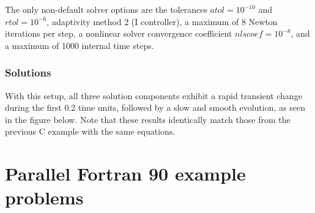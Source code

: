 \documentclass[letterpaper,10pt,english]{sphinxmanual}
\begin{document}
The only non-default solver options are the tolerances
\(atol=10^{-10}\) and \(rtol=10^{-6}\), adaptivity method 2 (I
controller), a maximum of 8 Newton iterations per step, a nonlinear
solver convergence coefficient \(nlscoef=10^{-8}\), and a maximum
of 1000 internal time steps.


\subsection{Solutions}
\label{f90_serial:solutions}
With this setup, all three solution components exhibit a rapid
transient change during the first 0.2 time units, followed by a slow
and smooth evolution, as seen in the figure below.  Note that these
results identically match those from the previous C example with the
same equations.
\begin{figure}[htbp]
\centering

\end{figure}


\chapter{Parallel Fortran 90 example problems}
\label{f90_parallel:parallel-fortran-90-example-problems}\label{f90_parallel::doc}\label{f90_parallel:parallel-f90}
\end{document}
